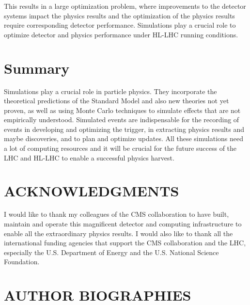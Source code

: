 \documentclass{wscpaperproc}
\theoremstyle{wsc}
\begin{document}
This results in a large optimization problem, where improvements to the detector systems impact the physics results and the optimization of the physics results require corresponding detector performance. Simulations play a crucial role to optimize detector and physics performance under HL-LHC running conditions. 

\section{Summary}
\label{sec:summary}

Simulations play a crucial role in particle physics. They incorporate the theoretical predictions of the Standard Model and also new theories not yet proven, as well as using Monte Carlo techniques to simulate effects that are not empirically understood. Simulated events are indispensable for the recording of events in developing and optimizing the trigger, in extracting physics results and maybe discoveries, and to plan and optimize updates. All these simulations need a lot of computing resources and it will be crucial for the future success of the LHC and HL-LHC to enable a successful physics harvest.

\section*{ACKNOWLEDGMENTS}
I would like to thank my colleagues of the CMS collaboration to have built, maintain and operate this magnificent detector and computing infrastructure to enable all the extraordinary physics results. I would also like to thank all the international funding agencies that support the CMS collaboration and the LHC, especially the U.S. Department of Energy and the U.S. National Science Foundation.

\appendix





\section*{AUTHOR BIOGRAPHIES}
\end{document}
